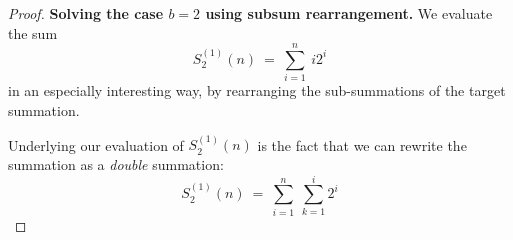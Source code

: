 \begin{proof}
{\bf Solving the case $b=2$ using subsum rearrangement.}
We evaluate the sum
\[
S_2^{(1)}(n) \ = \ \sum_{i=1}^n \ i 2^i
\]
in an especially interesting way, by rearranging the sub-summations of the target summation.

\bigskip

\noindent {}

\bigskip

Underlying our evaluation of $S_2^{(1)}(n)$ is the fact that we can rewrite the summation as a {\em double} summation:
\begin{equation}
\label{eq:geom-double-sum}
S_2^{(1)}(n) \ = \ \sum_{i=1}^n \ \sum_{k=1}^{i} 2^i
\end{equation}


\end{proof}
